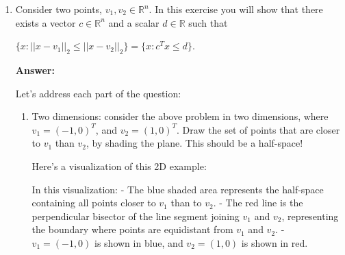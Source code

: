 \documentclass{article}
\newenvironment{answer}
    {\par\noindent\textbf{Answer:}\par}
    {\par}
\begin{document}
\begin{enumerate}
    \item Consider two points, $v_1, v_2 \in \mathbb{R}^n$. In this exercise you will show that there exists a vector $c \in \mathbb{R}^n$ and a scalar $d \in \mathbb{R}$ such that
    
    $\{x : ||x - v_1||_2 \leq ||x - v_2||_2\} = \{x : c^T x \leq d\}$.

    \begin{answer}
    Let's address each part of the question:

    \begin{enumerate}
        \item Two dimensions: consider the above problem in two dimensions, where $v_1 = (-1,0)^T$, and $v_2 = (1,0)^T$. Draw the set of points that are closer to $v_1$ than $v_2$, by shading the plane. This should be a half-space!

        Here's a visualization of this 2D example:
        
        \begin{center}
            \end{center}

        In this visualization:
        - The blue shaded area represents the half-space containing all points closer to $v_1$ than to $v_2$.
        - The red line is the perpendicular bisector of the line segment joining $v_1$ and $v_2$, representing the boundary where points are equidistant from $v_1$ and $v_2$.
        - $v_1 = (-1, 0)$ is shown in blue, and $v_2 = (1, 0)$ is shown in red.


\end{enumerate}
\end{answer}
\end{enumerate}
\end{document}
